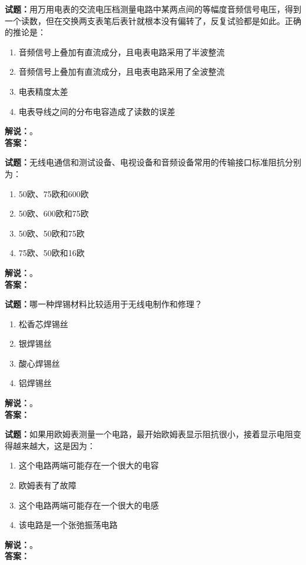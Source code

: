 \documentclass{ctexbook}
\begin{document}
\bigskip




\noindent\textbf{试题：}用万用电表的交流电压档测量电路中某两点间的等幅度音频信号电压，得到一个读数，但在交换两支表笔后表针就根本没有偏转了，反复试验都是如此。正确的推论是：
\begin{enumerate}[leftmargin=3em]
\item 音频信号上叠加有直流成分，且电表电路采用了半波整流
\item 音频信号上叠加有直流成分，且电表电路采用了全波整流
\item 电表精度太差
\item 电表导线之间的分布电容造成了读数的误差
\end{enumerate}
\noindent\textbf{解说：}\textbf{}。\\\noindent\textbf{答案：}

\bigskip




\noindent\textbf{试题：}无线电通信和测试设备、电视设备和音频设备常用的传输接口标准阻抗分别为：
\begin{enumerate}[leftmargin=3em]
\item 50欧、75欧和600欧
\item 50欧、600欧和75欧
\item 50欧、50欧和75欧
\item 75欧、50欧和16欧
\end{enumerate}
\noindent\textbf{解说：}\textbf{}。\\\noindent\textbf{答案：}

\bigskip




\noindent\textbf{试题：}哪一种焊锡材料比较适用于无线电制作和修理？
\begin{enumerate}[leftmargin=3em]
\item 松香芯焊锡丝
\item 银焊锡丝
\item 酸心焊锡丝
\item 铝焊锡丝
\end{enumerate}
\noindent\textbf{解说：}\textbf{}。\\\noindent\textbf{答案：}

\bigskip




\noindent\textbf{试题：}如果用欧姆表测量一个电路，最开始欧姆表显示阻抗很小，接着显示电阻变得越来越大，这是因为：
\begin{enumerate}[leftmargin=3em]
\item 这个电路两端可能存在一个很大的电容
\item 欧姆表有了故障
\item 这个电路两端可能存在一个很大的电感
\item 该电路是一个张弛振荡电路
\end{enumerate}
\noindent\textbf{解说：}\textbf{}。\\\noindent\textbf{答案：}
\end{document}
